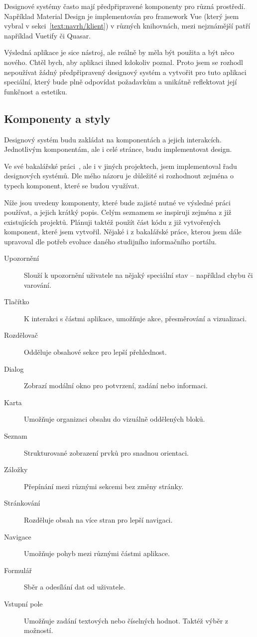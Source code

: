 Designové systémy často mají předpřipravené komponenty pro různá prostředí. 
Například Material Design je implementován pro framework Vue (který jsem vybral v sekci~\ref{text:navrh/klient}) v různých knihovnách, mezi nejznámější patří například Vuetify či Quasar.

Výsledná aplikace je sice nástroj, ale reálně by měla být použita a být něco nového. 
Chtěl bych, aby aplikaci ihned kdokoliv poznal. 
Proto jsem se rozhodl nepoužívat žádný předpřipravený designový systém a vytvořit pro tuto aplikaci speciální, který bude plně odpovídat požadavkům a unikátně reflektovat její funkčnost a estetiku.

\subsection{Komponenty a styly}\label{text:navrh/desgin/komponenty}\label{text:navrh/design/komponenty}

Designový systém budu zakládat na komponentách a jejich interakcích.
Jednotlivým komponentám, ale i celé stránce, budu implementovat design.

Ve své bakalářské práci~\cite{cajthaml_bp}, ale i v jiných projektech, jsem implementoval řadu designových systémů.
Dle mého názoru je důležité si rozhodnout zejména o typech komponent, které se budou využívat.

Níže jsou uvedeny komponenty, které bude zajisté nutné ve výsledné práci používat, a jejich krátký popis.
Celým seznamem se inspiruji zejména z již existujících projektů.
Plánuji taktéž použít část kódu z již vytvořených komponent, které jsem vytvořil.
Nějaké i z bakalářské práce, kterou jsem dále upravoval dle potřeb evoluce daného studijního informačního portálu. 

\begin{description} 
    \item[Upozornění] Slouží k upozornění uživatele na nějaký speciální stav – například chybu či varování. 
    \item[Tlačítko] K interakci s částmi aplikace, umožňuje akce, přesměrování a vizualizaci. 
    \item[Rozdělovač] Odděluje obsahové sekce pro lepší přehlednost. 
    \item[Dialog] Zobrazí modální okno pro potvrzení, zadání nebo informaci. 
    \item[Karta] Umožňuje organizaci obsahu do vizuálně oddělených bloků. 
    \item[Seznam] Strukturované zobrazení prvků pro snadnou orientaci. 
    \item[Záložky] Přepínání mezi různými sekcemi bez změny stránky. 
    \item[Stránkování] Rozděluje obsah na více stran pro lepší navigaci. 
    \item[Navigace] Umožňuje pohyb mezi různými částmi aplikace. 
    \item[Formulář] Sběr a odesílání dat od uživatele. 
    \item[Vstupní pole] Umožňuje zadání textových nebo číselných hodnot. Taktéž výběr z možností.
\end{description}

